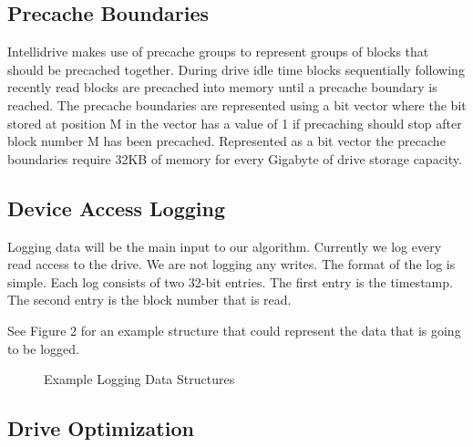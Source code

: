 \documentclass[letterpaper,twocolumn,10pt]{article}
\begin{document}
\subsection{Precache Boundaries}
Intellidrive makes use of precache groups to represent groups of blocks that should be precached together.  During drive idle time blocks sequentially following recently read blocks are precached into memory until a precache boundary is reached.  The precache boundaries are represented using a bit vector where the bit stored at position M in the vector has a value of 1 if precaching should stop after block number M has been precached.  Represented as a bit vector the precache boundaries require 32KB of memory for every Gigabyte of drive storage capacity.

\subsection{Device Access Logging}
Logging data will be the main input to our algorithm.  Currently we log every read access to the drive.  We are not logging any writes.  The format of the log is simple.  Each log consists of two 32-bit entries.  The first entry is the timestamp.  The second entry is the block number that is read.

See Figure 2 for an example structure that could represent the data that is going to be logged.

\begin{figure}[htb]
  \caption{Example Logging Data Structures}
\end{figure}

\subsection{Drive Optimization}
\end{document}
